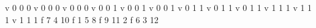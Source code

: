 
\begin{DoxyVerbInclude}
v 0 0 0
v 0 0 0
v 0 0 0
v 0 0 1
v 0 0 1
v 0 0 1
v 0 1 1
v 0 1 1
v 0 1 1
v 1 1 1
v 1 1 1
v 1 1 1
f 7 4 10
f 1 5 8
f 9 11 2
f 6 3 12
\end{DoxyVerbInclude}
 